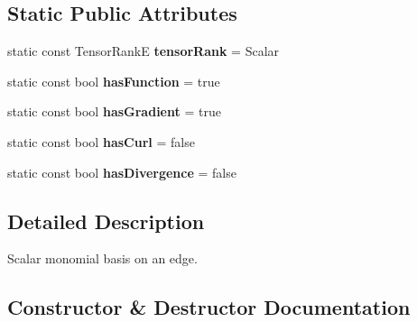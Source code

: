 \subsection*{Static Public Attributes}
\begin{DoxyCompactItemize}
\item 
\mbox{\label{classHArDCore2D_1_1MonomialScalarBasisEdge_afad80154f0c46b6132980c3edf9378a0}} 
static const Tensor\+RankE {\bfseries tensor\+Rank} = Scalar
\item 
\mbox{\label{classHArDCore2D_1_1MonomialScalarBasisEdge_a069544258c246a19a7574f22074fa4ee}} 
static const bool {\bfseries has\+Function} = true
\item 
\mbox{\label{classHArDCore2D_1_1MonomialScalarBasisEdge_a98b138ce500257ca01b37a6cc62cced7}} 
static const bool {\bfseries has\+Gradient} = true
\item 
\mbox{\label{classHArDCore2D_1_1MonomialScalarBasisEdge_a361073f6de474dfbc1c4aaa685220245}} 
static const bool {\bfseries has\+Curl} = false
\item 
\mbox{\label{classHArDCore2D_1_1MonomialScalarBasisEdge_a351c69a9068b7cae877fd1d4d369fabb}} 
static const bool {\bfseries has\+Divergence} = false
\end{DoxyCompactItemize}


\subsection{Detailed Description}
Scalar monomial basis on an edge. 

\subsection{Constructor \& Destructor Documentation}
\mbox{\label{classHArDCore2D_1_1MonomialScalarBasisEdge_a1794a48fbd89584ed844950e0057f513}} 

